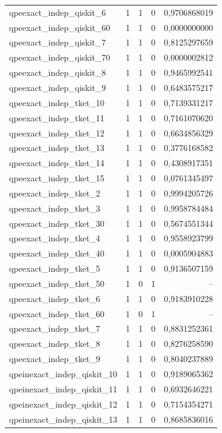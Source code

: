 \begin{longtable}{lrrrr}
qpeexact\_indep\_qiskit\_6 & 1 & 1 & 0 & 0,9706868019 \\
qpeexact\_indep\_qiskit\_60 & 1 & 1 & 0 & 0,0000000000 \\
qpeexact\_indep\_qiskit\_7 & 1 & 1 & 0 & 0,8125297659 \\
qpeexact\_indep\_qiskit\_70 & 1 & 1 & 0 & 0,0000002812 \\
qpeexact\_indep\_qiskit\_8 & 1 & 1 & 0 & 0,9465992541 \\
qpeexact\_indep\_qiskit\_9 & 1 & 1 & 0 & 0,6483575217 \\
qpeexact\_indep\_tket\_10 & 1 & 1 & 0 & 0,7139331217 \\
qpeexact\_indep\_tket\_11 & 1 & 1 & 0 & 0,7161070620 \\
qpeexact\_indep\_tket\_12 & 1 & 1 & 0 & 0,6634856329 \\
qpeexact\_indep\_tket\_13 & 1 & 1 & 0 & 0,3776168582 \\
qpeexact\_indep\_tket\_14 & 1 & 1 & 0 & 0,4308917351 \\
qpeexact\_indep\_tket\_15 & 1 & 1 & 0 & 0,0761345497 \\
qpeexact\_indep\_tket\_2 & 1 & 1 & 0 & 0,9994205726 \\
qpeexact\_indep\_tket\_3 & 1 & 1 & 0 & 0,9958784484 \\
qpeexact\_indep\_tket\_30 & 1 & 1 & 0 & 0,5674551344 \\
qpeexact\_indep\_tket\_4 & 1 & 1 & 0 & 0,9558923799 \\
qpeexact\_indep\_tket\_40 & 1 & 1 & 0 & 0,0005904883 \\
qpeexact\_indep\_tket\_5 & 1 & 1 & 0 & 0,9136507159 \\
qpeexact\_indep\_tket\_50 & 1 & 0 & 1 & -- \\
qpeexact\_indep\_tket\_6 & 1 & 1 & 0 & 0,9183910228 \\
qpeexact\_indep\_tket\_60 & 1 & 0 & 1 & -- \\
qpeexact\_indep\_tket\_7 & 1 & 1 & 0 & 0,8831252361 \\
qpeexact\_indep\_tket\_8 & 1 & 1 & 0 & 0,8276258590 \\
qpeexact\_indep\_tket\_9 & 1 & 1 & 0 & 0,8040237889 \\
qpeinexact\_indep\_qiskit\_10 & 1 & 1 & 0 & 0,9189065362 \\
qpeinexact\_indep\_qiskit\_11 & 1 & 1 & 0 & 0,6932646221 \\
qpeinexact\_indep\_qiskit\_12 & 1 & 1 & 0 & 0,7154354271 \\
qpeinexact\_indep\_qiskit\_13 & 1 & 1 & 0 & 0,8685836016 \\

\end{longtable}
